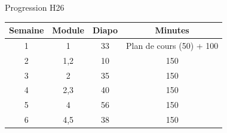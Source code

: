 \documentclass[12pt,french]{article}
\begin{document}
\Large{Progression H26}


\begin{table}[h]
    \centering
    \begin{tabular}{|c|c|c|c|}
    \hline
       Semaine  & Module & Diapo & Minutes \\
       \hline
        1   & 1 & 33 & Plan de cours (50) + 100\\
        \hline
        2 & 1,2 & 10 & 150 \\
        \hline
        3 & 2 & 35 & 150 \\
        \hline
        4 & 2,3 & 40 & 150 \\
        \hline
        5 & 4 & 56 & 150\\
        \hline
        6 & 4,5  & 38 & 150 \\
        \hline
    \end{tabular}

\end{table}
\end{document}
